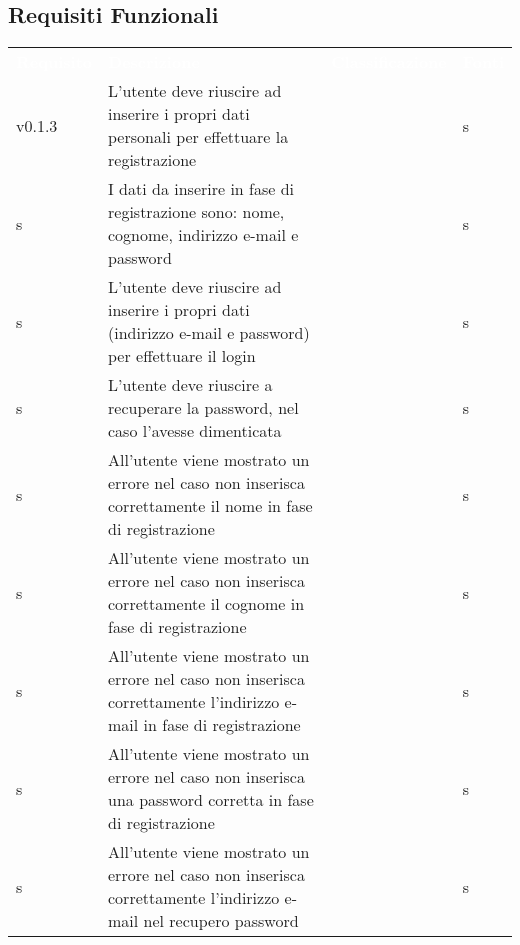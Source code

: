 \subsection{Requisiti Funzionali}


\renewcommand{\arraystretch}{1.5}
\begin{longtable}{ m{}<{\centering}  m{}<{\centering}  m{}<{\centering}  m{}<{\centering}}
	\rowcolor{darkblue}
	\textcolor{white}{\textbf{Requisito}} &\textcolor{white}{\textbf{Descrizione}}& \textcolor{white}{\textbf{Classificazione}} & \textcolor{white}{\textbf{Fonti}}\\ 

	v0.1.3 & L’utente deve riuscire ad inserire i propri dati personali per effettuare la registrazione & \Ob & s\\	

	 \rowcolor{gray!25} s & I dati da inserire in fase di registrazione sono: nome, cognome, indirizzo e-mail e password & \Ob & s\\	
	 
	 s & L’utente deve riuscire ad inserire i propri dati (indirizzo e-mail e password) per effettuare il login & \Ob & s\\	

	 \rowcolor{gray!25} s & L’utente deve riuscire a recuperare la password, nel caso l’avesse dimenticata & \Ob & s\\	
	 
	 s & All’utente viene mostrato un errore nel caso non inserisca correttamente il nome in fase di registrazione & \Ob & s\\	
	 
	 \rowcolor{gray!25} s & All’utente viene mostrato un errore nel caso non inserisca correttamente il cognome in fase di registrazione & \Ob & s\\	
	 
	 s & All’utente viene mostrato un errore nel caso non inserisca correttamente l’indirizzo e-mail in fase di registrazione & \Ob & s\\	

	 \rowcolor{gray!25} s & All’utente viene mostrato un errore nel caso non inserisca una password corretta in fase di registrazione & \Ob & s\\	
	 
	 s & All’utente viene mostrato un errore nel caso non inserisca correttamente l’indirizzo e-mail nel recupero password & \Ob & s\\	
	 

\end{longtable}
